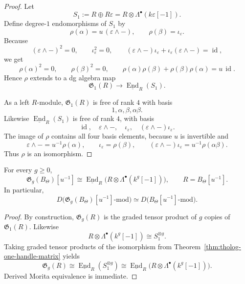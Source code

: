 \begin{proof}
Let
\[
S_{1}:=R\oplus R\varepsilon=R\otimes \Lambda^{\bullet}(k\varepsilon[-1]).
\]
Define degree-\(1\) endomorphisms of \(S_{1}\) by
\[
\rho(\alpha)=u\,(\varepsilon\wedge -),\qquad
\rho(\beta)=\iota_{\varepsilon}.
\]
Because
\[
(\varepsilon\wedge -)^{2}=0,\qquad \iota_{\varepsilon}^{2}=0,\qquad
(\varepsilon\wedge -)\iota_{\varepsilon}+\iota_{\varepsilon}(\varepsilon\wedge -)=\operatorname{id},
\]
we get
\[
\rho(\alpha)^{2}=0,\qquad
\rho(\beta)^{2}=0,\qquad
\rho(\alpha)\rho(\beta)+\rho(\beta)\rho(\alpha)=u\,\operatorname{id}.
\]
Hence \(\rho\) extends to a dg algebra map
\[
\mathfrak{G}_{1}(R)\longrightarrow \underline{\operatorname{End}}_{R}(S_{1}).
\]

As a left \(R\)-module, \(\mathfrak{G}_{1}(R)\) is free of rank \(4\) with basis
\[
1,\alpha,\beta,\alpha\beta.
\]
Likewise \(\underline{\operatorname{End}}_{R}(S_{1})\) is free of rank \(4\), with basis
\[
\operatorname{id},\quad \varepsilon\wedge -,\quad \iota_{\varepsilon},\quad
(\varepsilon\wedge -)\iota_{\varepsilon}.
\]
The image of \(\rho\) contains all four basis elements, because \(u\) is invertible and
\[
\varepsilon\wedge - = u^{-1}\rho(\alpha),\qquad
\iota_{\varepsilon}=\rho(\beta),\qquad
(\varepsilon\wedge -)\iota_{\varepsilon}=u^{-1}\rho(\alpha\beta).
\]
Thus \(\rho\) is an isomorphism.
\end{proof}

\begin{theorem}
\label{thm:tholog-morita-triviality}
For every \(g\geq 0\),
\[
\mathfrak{G}_{g}(B_{\Theta})[u^{-1}]
\cong
\underline{\operatorname{End}}_{R}
\Big(R\otimes \Lambda^{\bullet}(k^{g}[-1])\Big),
\qquad
R=B_{\Theta}[u^{-1}].
\]
In particular,
\[
D\!\big(\mathfrak{G}_{g}(B_{\Theta})[u^{-1}]\text{-mod}\big)
\simeq
D\!\big(B_{\Theta}[u^{-1}]\text{-mod}\big).
\]
\end{theorem}

\begin{proof}
By construction, \(\mathfrak{G}_{g}(R)\) is the graded tensor product of \(g\) copies of \(\mathfrak{G}_{1}(R)\).
Likewise
\[
R\otimes \Lambda^{\bullet}(k^{g}[-1])
\cong
S_{1}^{\otimes g}.
\]
Taking graded tensor products of the isomorphism from Theorem~\ref{thm:tholog-one-handle-matrix} yields
\[
\mathfrak{G}_{g}(R)\cong
\underline{\operatorname{End}}_{R}(S_{1}^{\otimes g})
\cong
\underline{\operatorname{End}}_{R}
\Big(R\otimes \Lambda^{\bullet}(k^{g}[-1])\Big).
\]
Derived Morita equivalence is immediate.
\end{proof}

